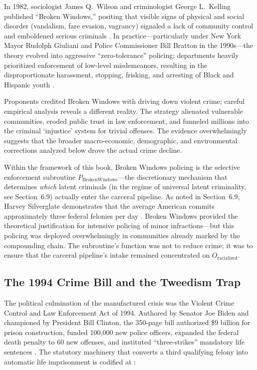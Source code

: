In 1982, sociologist James Q.\ Wilson and criminologist George L.\ Kelling published ``Broken Windows,'' positing that visible signs of physical and social disorder (vandalism, fare evasion, vagrancy) signaled a lack of community control and emboldened serious criminals \cite{wilson}. In practice---particularly under New York Mayor Rudolph Giuliani and Police Commissioner Bill Bratton in the 1990s---the theory evolved into aggressive ``zero-tolerance'' policing: departments heavily prioritized enforcement of low-level misdemeanors, resulting in the disproportionate harassment, stopping, frisking, and arresting of Black and Hispanic youth \cite{harcourt}.

Proponents credited Broken Windows with driving down violent crime; careful empirical analysis reveals a different reality. The strategy alienated vulnerable communities, eroded public trust in law enforcement, and funneled millions into the criminal `injustice' system for trivial offenses. The evidence overwhelmingly suggests that the broader macro-economic, demographic, and environmental corrections analyzed below drove the actual crime decline.

Within the framework of this book, Broken Windows policing is the selective enforcement subroutine $P_{\text{BrokenWindows}}$---the discretionary mechanism that determines \textit{which} latent criminals (in the regime of universal latent criminality, see Section~6.9) actually enter the carceral pipeline. As noted in Section~6.9, Harvey Silverglate demonstrates that the average American commits approximately three federal felonies per day \cite{silverglate}. Broken Windows provided the theoretical justification for intensive policing of minor infractions---but this policing was deployed overwhelmingly in communities already marked by the compounding chain. The subroutine's function was not to reduce crime; it was to ensure that the carceral pipeline's intake remained concentrated on $O_{\text{racialized}}$.

\subsection{The 1994 Crime Bill and the Tweedism Trap}

The political culmination of the manufactured crisis was the Violent Crime Control and Law Enforcement Act of 1994. Authored by Senator Joe Biden and championed by President Bill Clinton, the 350-page bill authorized \$9 billion for prison construction, funded 100,000 new police officers, expanded the federal death penalty to 60 new offenses, and instituted ``three-strikes'' mandatory life sentences \cite{forman}. The statutory machinery that converts a third qualifying felony into automatic life imprisonment is codified at :

